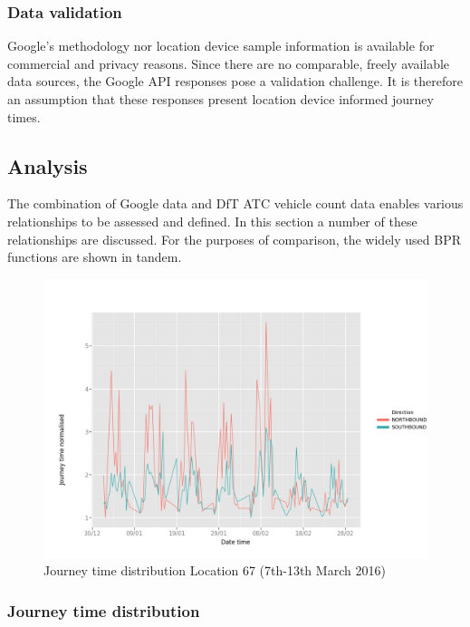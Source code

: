 \documentclass{CUP-JNL-DCE}
\begin{document}
\subsubsection{Data validation}

Google's methodology nor location device sample information is available for commercial and privacy reasons. Since there are no comparable, freely available data sources, the Google API responses pose a validation challenge. It is therefore an assumption that these responses present location device informed journey times.

\subsection{Analysis}

The combination of Google data and DfT ATC vehicle count data enables various relationships to be assessed and defined. In this section a number of these relationships are discussed. For the purposes of comparison, the widely used BPR functions are shown in tandem.

\begin{figure}[htbp!] 
	\centering    
	\includegraphics[width=1.0\textwidth]{Picture25}
	\caption[Journey time distribution Location 67 (7th-13th March 2016)]{Journey time distribution Location 67 (7th-13th March 2016)}
	\label{fig:Picture3.25}
\end{figure}

\subsubsection{Journey time distribution}
\end{document}
